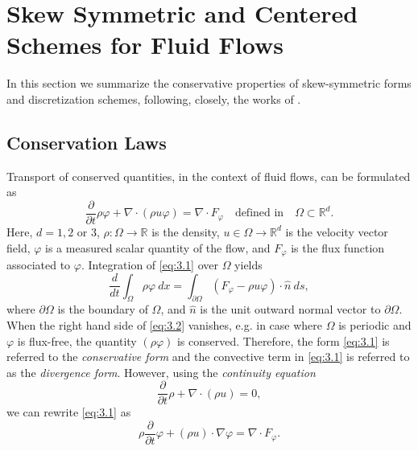 \section{Skew Symmetric and Centered Schemes for Fluid Flows} \label{sec:skew}

In this section we summarize the conservative properties of skew-symmetric forms and discretization schemes, following, closely, the works of \cite{morinishi2010skew,morinishi1998fully,reiss2014conservative}.

\subsection{Conservation Laws} \label{sec:skew.1}
Transport of conserved quantities, in the context of fluid flows, can be formulated as
\begin{equation} \label{eq:3.1}
	\frac{\partial }{\partial t} \rho \varphi + \nabla \cdot ( \rho u \varphi  ) = \nabla \cdot F_{\varphi}\quad \text{defined in} \quad \Omega \subset \mathbb R^{d}.
\end{equation}
Here, $d = 1,2$ or $3$, $\rho:\Omega\to \mathbb R$ is the density, $u\in \Omega \to \mathbb R^{d}$ is the velocity vector field, $\varphi$ is a measured scalar quantity of the flow, and $F_{\varphi}$ is the flux function associated to $\varphi$. Integration of \eqref{eq:3.1} over $ \Omega$ yields
\begin{equation} \label{eq:3.2}
	\frac{d}{dt} \int_{\Omega} \rho \varphi \ dx = \int_{\partial \Omega} (F_{\varphi} - \rho u \varphi) \cdot \hat n\ ds,
\end{equation}
where $\partial \Omega$ is the boundary of $\Omega$, and $\hat n$ is the unit outward normal vector to $\partial \Omega$. When the right hand side of \eqref{eq:3.2} vanishes, e.g. in case where $\Omega$ is periodic and $\varphi$ is flux-free, the quantity $(\rho \varphi)$ is conserved. Therefore, the form \eqref{eq:3.1} is referred to the \emph{conservative form} and the convective term in \eqref{eq:3.1} is referred to as the \emph{divergence form}. However, using the \emph{continuity equation}
\begin{equation} \label{eq:3.3}
	\frac{\partial }{\partial t} \rho + \nabla \cdot (\rho u) = 0,
\end{equation}
we can rewrite \eqref{eq:3.1} as
\begin{equation} \label{eq:3.4}
	\rho \frac{\partial }{\partial t} \varphi + (\rho u)\cdot \nabla \varphi = \nabla \cdot F_{\varphi}.
\end{equation}
